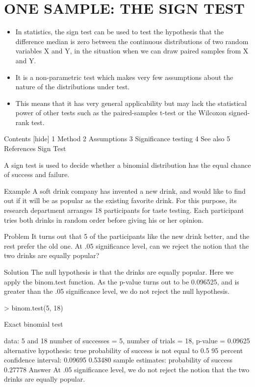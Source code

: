 \section{ONE SAMPLE: THE SIGN TEST}
\begin{itemize}
\item In statistics, the sign test can be used to test the hypothesis that the difference median is zero between the continuous distributions of two random variables X and Y, in the situation when we can draw paired samples from X and Y. 
\item It is a non-parametric test which makes very few assumptions about the nature of the distributions under test. 
\item This means that it has very general applicability but may lack the statistical power of other tests such as the paired-samples t-test or the Wilcoxon signed-rank test.
\end{itemize}

Contents  [hide] 
1 Method
2 Assumptions
3 Significance testing
4 See also
5 References
Sign Test

A sign test is used to decide whether a binomial distribution has the equal chance of success and failure.

Example
A soft drink company has invented a new drink, and would like to find out if it will be as popular as the existing favorite drink. For this purpose, its research department arranges 18 participants for taste testing. Each participant tries both drinks in random order before giving his or her opinion.

Problem
It turns out that 5 of the participants like the new drink better, and the rest prefer the old one. At .05 significance level, can we reject the notion that the two drinks are equally popular?

Solution
The null hypothesis is that the drinks are equally popular. Here we apply the binom.test function. As the p-value turns out to be 0.096525, and is greater than the .05 significance level, we do not reject the null hypothesis.

> binom.test(5, 18) 
 
        Exact binomial test 
 
data:  5 and 18 
number of successes = 5, number of trials = 18, 
p-value = 0.09625 
alternative hypothesis: true probability of success is not equal to 0.5 
95 percent confidence interval: 
 0.09695 0.53480 
sample estimates: 
probability of success 
               0.27778
Answer
At .05 significance level, we do not reject the notion that the two drinks are equally popular.
